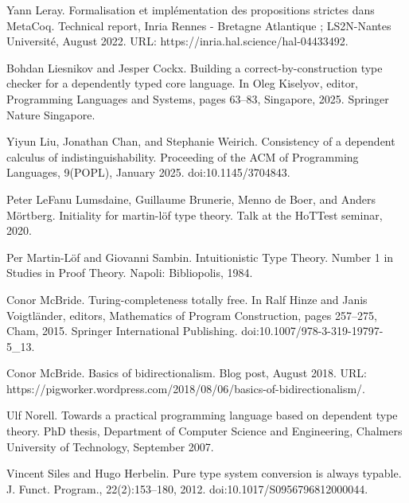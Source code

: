 \par\noindent  [36]  Yann Leray.  Formalisation et implémentation des propositions strictes dans MetaCoq.  Technical report, Inria Rennes - Bretagne Atlantique ; LS2N-Nantes Université, August 2022.  URL: https://inria.hal.science/hal-04433492.  
 
\par\noindent  [37]  Bohdan Liesnikov and Jesper Cockx.  Building a correct-by-construction type checker for a dependently typed core language.  In Oleg Kiselyov, editor, Programming Languages and Systems, pages 63–83, Singapore, 2025. Springer Nature Singapore.  
 
\par\noindent  [38]  Yiyun Liu, Jonathan Chan, and Stephanie Weirich.  Consistency of a dependent calculus of indistinguishability.  Proceeding of the ACM of Programming Languages, 9(POPL), January 2025.  doi:10.1145/3704843.  
 
\par\noindent  [39]  Peter LeFanu Lumsdaine, Guillaume Brunerie, Menno de Boer, and Anders Mörtberg.  Initiality for martin-löf type theory.  Talk at the HoTTest seminar, 2020.  
 
\par\noindent  [40]  Per Martin-Löf and Giovanni Sambin.  Intuitionistic Type Theory.  Number 1 in Studies in Proof Theory. Napoli: Bibliopolis, 1984.  
 
\par\noindent  [41]  Conor McBride.  Turing-completeness totally free.  In Ralf Hinze and Janis Voigtländer, editors, Mathematics of Program Construction, pages 257–275, Cham, 2015. Springer International Publishing.  doi:10.1007/978-3-319-19797-5\_13.  
 
\par\noindent  [42]  Conor McBride.  Basics of bidirectionalism.  Blog post, August 2018.  URL: https://pigworker.wordpress.com/2018/08/06/basics-of-bidirectionalism/.  
 
\par\noindent  [43]  Ulf Norell.  Towards a practical programming language based on dependent type theory.  PhD thesis, Department of Computer Science and Engineering, Chalmers University of Technology, September 2007.  
 
\par\noindent  [44]  Vincent Siles and Hugo Herbelin.  Pure type system conversion is always typable.  J. Funct. Program., 22(2):153–180, 2012.  doi:10.1017/S0956796812000044.  
 
